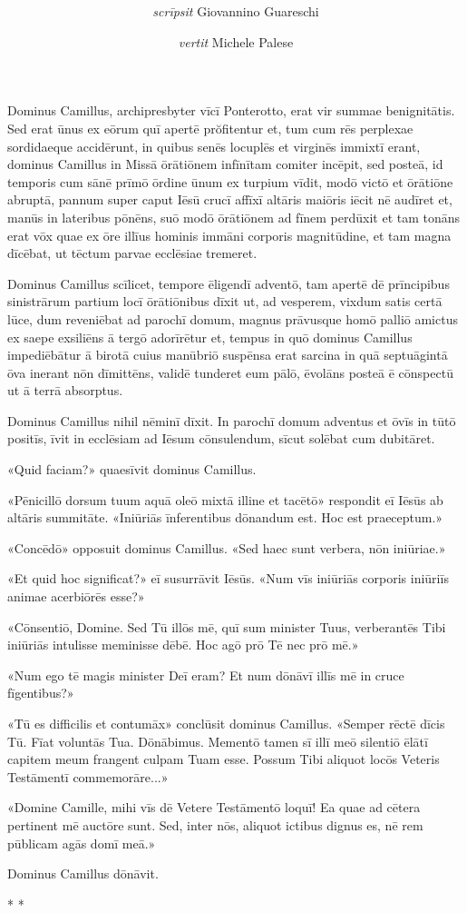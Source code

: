 \documentclass[a4paper, 12pt]{article}
\title{
	\MyTitle
}
\author{\textit{scrīpsit} Giovannino Guareschi \and \textit{vertit} Michele Palese}
\date{}
\newcommand{\sta}{
	\begin{center}
		\Large * * *
	\end{center}
}
\begin{document}
	
	\maketitle
	
	Dominus Camillus, archipresbyter vīcī Ponterotto, erat vir summae benignitātis.
	Sed erat ūnus ex eōrum quī apertē prŏfitentur et, tum cum rēs perplexae sordidaeque accidērunt, in quibus senēs locuplēs et virginēs immixtī erant, dominus Camillus in Missā ōrātiōnem infīnītam comiter incēpit, sed posteā, id temporis cum sānē prīmō ōrdine ūnum ex turpium vīdit, modō victō et ōrātiōne abruptā, pannum super caput Iēsū crucī affīxī altāris maiōris iēcit nē audīret et, manūs in lateribus pōnēns, suō modō ōrātiōnem ad fīnem perdūxit et tam tonāns erat vōx quae ex ōre illīus hominis immāni corporis magnitūdine, et tam magna dīcēbat, ut tēctum parvae ecclēsiae tremeret.
	
	Dominus Camillus scīlicet, tempore ēligendī adventō, tam apertē dē prīncipibus sinistrārum partium locī ōrātiōnibus dīxit ut, ad vesperem, vixdum satis certā lūce, dum reveniēbat ad parochī domum, magnus prāvusque homō palliō amictus ex saepe exsiliēns ā tergō adorīrētur et, tempus in quō dominus Camillus impediēbātur ā birotā cuius manūbriō suspēnsa erat sarcina in quā septuāgintā ōva inerant nōn dīmittēns, validē tunderet eum pālō, ēvolāns posteā ē cōnspectū ut ā terrā absorptus.
	
	Dominus Camillus nihil nēminī dīxit.
	In parochī domum adventus et ōvīs in tūtō positīs, īvit in ecclēsiam ad Iēsum cōnsulendum, sīcut solēbat cum dubitāret.
	
	«Quid faciam?» quaesīvit dominus Camillus.
	
	«Pēnicillō dorsum tuum aquā oleō mixtā illine et tacētō» respondit eī Iēsūs ab altāris summitāte.
	«Iniūriās īnferentibus dōnandum est. Hoc est praeceptum.»
	
	«Concēdō» opposuit dominus Camillus.
	«Sed haec sunt verbera, nōn iniūriae.»
	
	«Et quid hoc significat?» eī susurrāvit Iēsūs.
	«Num vīs iniūriās corporis iniūriīs animae acerbiōrēs esse?»
	
	«Cōnsentiō, Domine.
	Sed Tū illōs mē, quī sum minister Tuus, verberantēs Tibi iniūriās intulisse meminisse dēbē.
	Hoc agō prō Tē nec prō mē.»
	
	«Num ego tē magis minister Deī eram?
	Et num dōnāvī illīs mē in cruce fīgentibus?»
	
	«Tū es difficilis et contumāx» conclūsit dominus Camillus.
	«Semper rēctē dīcis Tū.
	Fīat voluntās Tua.
	Dōnābimus.
	Mementō tamen sī illī meō silentiō ēlātī capitem meum frangent culpam Tuam esse.
	Possum Tibi aliquot locōs Veteris Testāmentī commemorāre...»
	
	«Domine Camille, mihi vīs dē Vetere Testāmentō loquī!
	Ea quae ad cētera pertinent mē auctōre sunt.
	Sed, inter nōs, aliquot ictibus dignus es, nē rem pūblicam agās domī meā.»
	
	Dominus Camillus dōnāvit.
	
	\sta
	
\end{document}

